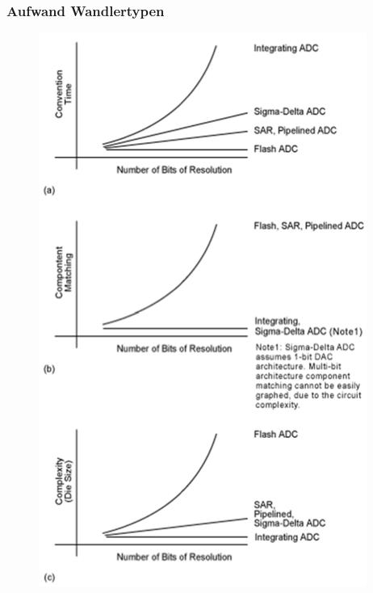\subsubsection{Aufwand Wandlertypen}
\begin{figure}[!htbp]
\includegraphics[scale=0.5]{pictures/aufwandWandler}
\end{figure}
